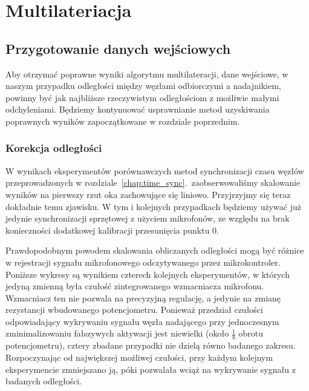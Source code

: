 \chapter{Multilateriacja}\label{chap:multilateration}

\section{Przygotowanie danych wejściowych}

Aby otrzymać poprawne wyniki algorytmu multilateracji, dane wejściowe, w naszym przypadku odległości między węzłami odbiorczymi a nadajnikiem, powinny być jak najbliższe rzeczywistym odległościom z możliwie małymi odchyleniami. Będziemy kontynuować usprawnianie metod uzyskiwania poprawnych wyników zapoczątkowane w rozdziale poprzednim.

\subsection{Korekcja odległości}

W wynikach eksperymentów porównawczych metod synchronizacji czasu węzłów przeprowadzonych w rozdziale~\ref{chap:time_sync}.\ zaobserwowaliśmy skalowanie wyników na pierwszy rzut oka zachowujące się liniowo. Przyjrzyjmy się teraz dokładnie temu zjawisku. W tym i kolejnych przypadkach będziemy używać już jedynie synchronizacji sprzętowej z użyciem mikrofonów, ze względu na brak konieczności dodatkowej kalibracji przesunięcia punktu 0.

Prawdopodobnym powodem skalowania obliczanych odległości mogą być różnice w rejestracji sygnału mikrofonowego odczytywanego przez mikrokontroler. Poniższe wykresy są wynikiem czterech kolejnych eksperymentów, w których jedyną zmienną była czułość zintegrowanego wzmacniacza mikrofonu. Wzmacniacz ten nie pozwala na precyzyjną regulację, a jedynie na zmianę rezystancji wbudowanego potencjometru. Ponieważ przedział czułości odpowiadający wykrywaniu sygnału węzła nadającego przy jednoczesnym zminimalizowaniu fałszywych aktywacji jest niewielki (około $\frac{1}{8}$ obrotu potencjometru), cztery zbadane przypadki nie dzielą równo badanego zakresu. Rozpoczynając od największej możliwej czułości, przy każdym kolejnym eksperymencie zmniejszano ją, póki pozwalała wciąż na wykrywanie sygnału z badanych odległości.

